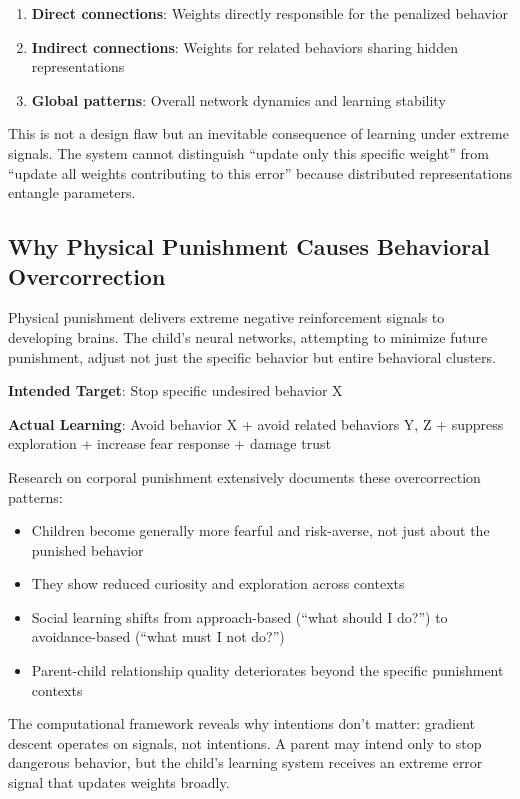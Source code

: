\documentclass{article}
\begin{document}
\begin{enumerate}
\item \textbf{Direct connections}: Weights directly responsible for the penalized behavior
\item \textbf{Indirect connections}: Weights for related behaviors sharing hidden representations
\item \textbf{Global patterns}: Overall network dynamics and learning stability
\end{enumerate}

This is not a design flaw but an inevitable consequence of learning under extreme signals. The system cannot distinguish ``update only this specific weight'' from ``update all weights contributing to this error'' because distributed representations entangle parameters.

\subsection{Why Physical Punishment Causes Behavioral Overcorrection}

Physical punishment delivers extreme negative reinforcement signals to developing brains. The child's neural networks, attempting to minimize future punishment, adjust not just the specific behavior but entire behavioral clusters.

\textbf{Intended Target}: Stop specific undesired behavior X

\textbf{Actual Learning}: Avoid behavior X + avoid related behaviors Y, Z + suppress exploration + increase fear response + damage trust

Research on corporal punishment extensively documents these overcorrection patterns:

\begin{itemize}
\item Children become generally more fearful and risk-averse, not just about the punished behavior \cite{gershoff2002}
\item They show reduced curiosity and exploration across contexts \cite{straus2009}
\item Social learning shifts from approach-based (``what should I do?'') to avoidance-based (``what must I not do?'') \cite{taylor2010}
\item Parent-child relationship quality deteriorates beyond the specific punishment contexts \cite{mackenzie2015}
\end{itemize}

The computational framework reveals why intentions don't matter: gradient descent operates on signals, not intentions. A parent may intend only to stop dangerous behavior, but the child's learning system receives an extreme error signal that updates weights broadly.
\end{document}
